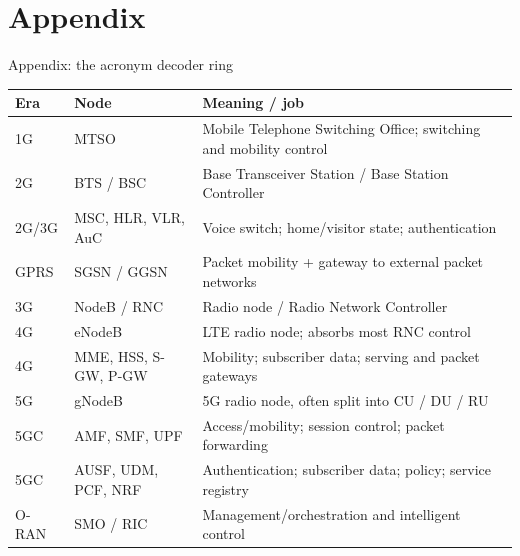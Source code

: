 
\section[Appendix]{Appendix}


\begin{frame}{Appendix: the acronym decoder ring}
  \scriptsize
  \renewcommand{\arraystretch}{1.12}
  \begin{tabularx}{\textwidth}{l l X}
    \toprule
    \textbf{Era} & \textbf{Node} & \textbf{Meaning / job} \\
    \midrule
    1G & MTSO & Mobile Telephone Switching Office; switching and mobility control \\
    2G & BTS / BSC & Base Transceiver Station / Base Station Controller \\
    2G/3G & MSC, HLR, VLR, AuC & Voice switch; home/visitor state; authentication \\
    GPRS & SGSN / GGSN & Packet mobility + gateway to external packet networks \\
    3G & NodeB / RNC & Radio node / Radio Network Controller \\
    4G & eNodeB & LTE radio node; absorbs most RNC control \\
    4G & MME, HSS, S-GW, P-GW & Mobility; subscriber data; serving and packet gateways \\
    5G & gNodeB & 5G radio node, often split into CU / DU / RU \\
    5GC & AMF, SMF, UPF & Access/mobility; session control; packet forwarding \\
    5GC & AUSF, UDM, PCF, NRF & Authentication; subscriber data; policy; service registry \\
    O-RAN & SMO / RIC & Management/orchestration and intelligent control \\
    \bottomrule
  \end{tabularx}

\end{frame}


